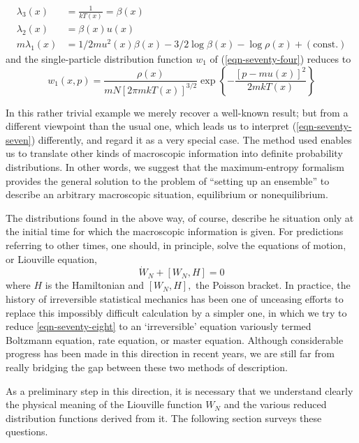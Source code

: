 \documentclass[]{article}
\begin{document}
\begin{equation}
\begin{aligned}
\lambda_{3}(x) &=\frac{1}{k T(x)}=\beta(x) \\
\lambda_{2}(x) &=\beta(x) u(x) \\
m \lambda_{1}(x) &=1 / 2 m u^{2}(x) \beta(x)-3 / 2 \log \beta(x)-\log \rho(x)+(\text {const.})
\end{aligned}
\end{equation}
and the single-particle distribution function $w_{1}$ of (\ref{eqn-seventy-four}) reduces to
\begin{equation}
w_{1}(x, p)=\frac{\rho(x)}{m N\left[2 \pi m k T(x)\right]^{3 / 2}} \exp \left\{-\frac{[p-mu(x)]^{2}}{2 m kT(x)}\right\} \label{eqn-seventy-seven}
\end{equation}

In this rather trivial example we merely recover a well-known result; but from a different viewpoint than the usual one, which leads us to interpret (\ref{eqn-seventy-seven}) differently, and regard it as a very special case. The method used enables us to translate other kinds of macroscopic information into definite probability distributions. In other words, we suggest that the maximum-entropy formalism provides the general solution to the problem of ``setting up an ensemble'' to describe an arbitrary macroscopic situation, equilibrium or nonequilibrium.

The distributions found in the above way, of course, describe he situation only at the initial time for which the macroscopic information is given. For predictions referring to other times, one should, in principle, solve the equations of motion, or Liouville equation,
\begin{equation}
\dot{W} _{ N }+\left[ W _{ N }, H \right]=0 \label{eqn-seventy-eight}
\end{equation}
where $H$ is the Hamiltonian and $\left[ W _{ N }, H \right],$ the Poisson bracket. In practice, the history of irreversible statistical mechanics has been one of unceasing efforts to replace this impossibly difficult calculation by a simpler one, in which we try to reduce \ref{eqn-seventy-eight} to an `irreversible' equation variously termed Boltzmann equation, rate equation, or master equation. Although considerable progress has been made in this direction in recent years, we are still far from really bridging the gap between these two methods of description. 

As a preliminary step in this direction, it is necessary that we understand clearly the physical meaning of the Liouville function $W_{N}$ and the various reduced distribution functions derived from it. The following section surveys these questions.
\end{document}
